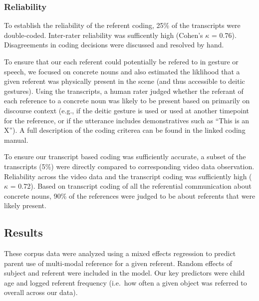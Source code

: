 \documentclass[english,,man,floatsintext]{apa6}
\begin{document}
\hypertarget{reliability}{%
\subsubsection{Reliability}\label{reliability}}

To establish the reliability of the referent coding, 25\% of the transcripts were double-coded. Inter-rater reliability was sufficently high (Cohen's \(\kappa\) = 0.76). Disagreements in coding decisions were discussed and resolved by hand.

To ensure that our each referent could potentially be refered to in gesture or speech, we focused on concrete nouns and also estimated the liklihood that a given referent was physically present in the scene (and thus accessible to deitic gestures). Using the transcripts, a human rater judged whether the referant of each reference to a concrete noun was likely to be present based on primarily on discourse context (e.g., if the deitic gesture is used or used at another timepoint for the reference, or if the utterance includes demonstratives such as \enquote{This is an X}). A full description of the coding criterea can be found in the linked coding manual.

To ensure our transcript based coding was sufficiently accurate, a subset of the transcripts (5\%) were directly compared to corresponding video data observation. Reliability across the video data and the transcript coding was sufficiently high (\(\kappa\) = 0.72). Based on transcript coding of all the referential communication about concrete nouns, 90\% of the references were judged to be about referents that were likely present.

\hypertarget{results}{%
\subsection{Results}\label{results}}

These corpus data were analyzed using a mixed effects regression to predict parent use of multi-modal reference for a given referent. Random effects of subject and referent were included in the model. Our key predictors were child age and logged referent frequency (i.e.~how often a given object was referred to overall across our data).
\end{document}
